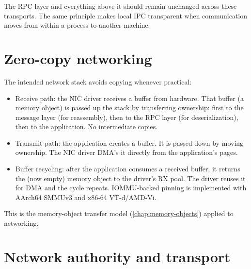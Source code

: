 The RPC layer and everything above it should remain unchanged across these
transports. The same principle makes local IPC transparent when communication
moves from within a process to another machine.

\section{Zero-copy networking}

The intended network stack avoids copying whenever practical:

\begin{itemize}
    \item Receive path: the NIC driver receives a buffer from hardware.
        That buffer (a memory object) is passed up the stack by transferring
        ownership: first to the message layer (for reassembly), then to the
        RPC layer (for deserialization), then to the application. No intermediate
        copies.
    \item Transmit path: the application creates a buffer. It is passed
        down by moving ownership. The NIC driver DMA's it directly from the
        application's pages.
    \item Buffer recycling: after the application consumes a received
        buffer, it returns the (now empty) memory object to the driver's RX pool.
        The driver reuses it for DMA and the cycle repeats. IOMMU-backed pinning
        is implemented with AArch64 SMMUv3 and x86-64 VT-d/AMD-Vi.
\end{itemize}

This is the memory-object transfer model (\autoref{chap:memory-objects})
applied to networking.

\section{Network authority and transport}

